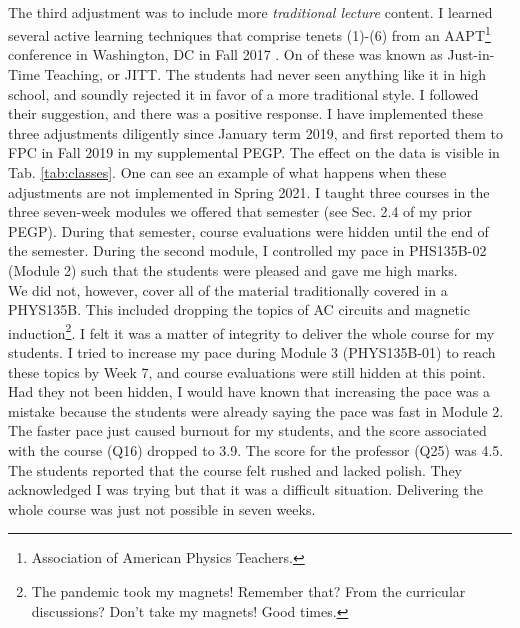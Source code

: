 \documentclass[../../../main.tex]{subfiles}
\begin{document}
\\
\vspace{0.15cm}
The third adjustment was to include more \textit{traditional lecture} content.  I learned several active learning techniques that comprise tenets (1)-(6) from an AAPT\footnote{Association of American Physics Teachers.} conference in Washington, DC in Fall 2017 \cite{AAPTPI}.  On of these was known as Just-in-Time Teaching, or JITT.  The students had never seen anything like it in high school, and soundly rejected it in favor of a more traditional style.  I followed their suggestion, and there was a positive response.  I have implemented these three adjustments diligently since January term 2019, and first reported them to FPC in Fall 2019 in my supplemental PEGP.  The effect on the data is visible in Tab. \ref{tab:classes}.  One can see an example of what happens when these adjustments are not implemented in Spring 2021.  I taught three courses in the three seven-week modules we offered that semester (see Sec. 2.4 of my prior PEGP).  During that semester, course evaluations were hidden until the end of the semester.  During the second module, I controlled my pace in PHS135B-02 (Module 2) such that the students were pleased and gave me high marks.
\\
\vspace{0.15cm}
We did not, however, cover all of the material traditionally covered in a PHYS135B.  This included dropping the topics of AC circuits and magnetic induction\footnote{The pandemic took my magnets!  Remember that?  From the curricular discussions?  Don't take my magnets!  Good times.}.  I felt it was a matter of integrity to deliver the whole course for my students. I tried to increase my pace during Module 3 (PHYS135B-01) to reach these topics by Week 7, and course evaluations were still hidden at this point.  Had they not been hidden, I would have known that increasing the pace was a mistake because the students were already saying the pace was fast in Module 2.  The faster pace just caused burnout for my students, and the score associated with the course (Q16) dropped to 3.9.  The score for the professor (Q25) was 4.5.  The students reported that the course felt rushed and lacked polish.  They acknowledged I was trying but that it was a difficult situation.  Delivering the whole course was just not possible in seven weeks.
\\
\vspace{0.15cm}
\end{document}
